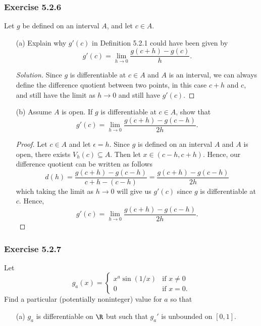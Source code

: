 \subsubsection{Exercise 5.2.6} 
Let \( g  \) be defined on an interval \( A  \), and let \( c \in A  \).
\begin{enumerate}
    \item[(a)] Explain why \( g'(c)  \) in Definition 5.2.1 could have been given by
        \[  g'(c) = \lim_{ h \to 0 } \frac{ g(c + h) - g(c)  }{ h }. \]
        \begin{proof}[Solution]
        Since \( g  \) is differentiable at \( c \in A  \) and \( A  \) is an interval, we can always define the difference quotient between two points, in this case \( c + h  \) and \( c  \), and still have the limit as \( h \to 0  \) and still have \( g'(c) \).
        \end{proof}
    \item[(b)] Assume \( A  \) is open. If \( g  \) is differentiable at \( c \in A  \), show that 
        \[  g'(c) = \lim_{ h \to 0 } \frac{ g(c+h) - g(c-h)  }{ 2h }. \]
        \begin{proof}
            Let \( c \in A  \) and let \( \epsilon = h  \). Since \( g  \) is defined on an interval \( A  \) and \( A  \) is open, there exists \( V_{h}(c) \subseteq A  \). Then let \( x \in (c -h, c + h ) \). Hence, our difference quotient can be written as follows
            \[  d(h) = \frac{ g(c + h) - g(c -h ) }{ c + h - (c -h) } = \frac{ g(c + h) - g(c -h ) }{ 2h }  \]
            which taking the limit as \( h \to 0  \) will give us \( g'(c) \) since \( g  \) is differentiable at \( c  \). Hence, 
            \[  g'(c) = \lim_{ h \to 0 } \frac{ g(c+h) - g(c-h) }{ 2h }.\]
        \end{proof}
\end{enumerate}


\subsubsection{Exercise 5.2.7} Let 
\[  g_a(x) = 
\begin{cases}
    x^a \sin(1/x) &\text{if } x \neq 0 \\
    0 &\text{if } x = 0. 
\end{cases} \]
Find a particular (potentially noninteger) value for \( a \) so that
\begin{enumerate}
    \item[(a)] \( g_a \) is differentiable on \( \R  \) but such that \( g_a' \) is unbounded on \( [0,1] \).
\end{enumerate}


